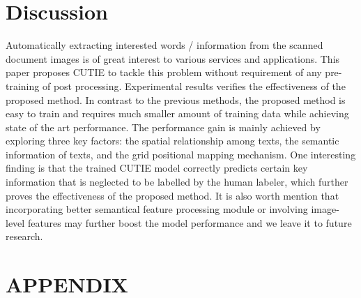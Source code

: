 \documentclass[10pt,twocolumn,letterpaper]{article}
\begin{document}
\section{Discussion}
Automatically extracting interested words / information from the scanned document images is of great interest to various services and applications. This paper proposes CUTIE to tackle this problem without requirement of any pre-training of post processing. Experimental results verifies the effectiveness of the proposed method. In contrast to the previous methods, the proposed method is easy to train and requires much smaller amount of training data while achieving state of the art performance. The performance gain is mainly achieved by exploring three key factors: the spatial relationship among texts, the semantic information of texts, and the grid positional mapping mechanism. One interesting finding is that the trained CUTIE model correctly predicts certain key information that is neglected to be labelled by the human labeler, which further proves the effectiveness of the proposed method. It is also worth mention that incorporating better semantical feature processing module or involving image-level features may further boost the model performance and we leave it to future research.

{\small


}

\section{APPENDIX}
\end{document}
